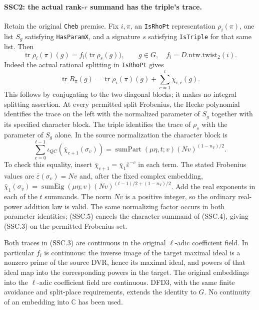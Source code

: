 \paragraph{SSC2: the actual rank-$r$ summand has the triple's trace.}
\label{claim:SSC2}
Retain the original \texttt{Cheb} premise. Fix $i,\pi$, an
\texttt{IsRhoPt} representation $\rho_i(\pi)$, one list $S_g$
satisfying \texttt{HasParamX}, and a signature $s$ satisfying
\texttt{IsTriple} for that same list. Then
\[
 \operatorname{tr}\rho_i(\pi)(g)
   =f_i\bigl(\operatorname{tr}\rho_s(g)\bigr),\qquad g\in G,
 \quad f_i=D.\mathrm{ntw}.\mathrm{twist}_2(i).                  \tag{SSC.3}
\]
Indeed the actual rational splitting in \texttt{IsRhoPt} gives
\[
 \operatorname{tr}R_\pi(g)
    =\operatorname{tr}\rho_i(\pi)(g)
       +\sum_{c=1}^{t}\chi_{i,c}(g).                           \tag{SSC.4}
\]
This follows by conjugating to the two diagonal blocks; it makes
no integral splitting assertion. At every permitted split Frobenius,
the Hecke polynomial identifies the trace on the left with the
normalized parameter of $S_g$ together with its specified character
block. The triple identifies the trace of $\rho_s$ with the parameter
of $S_g$ alone. In the source normalization the character block is
\[
 \sum_{c=0}^{t-1}\iota_{QC}(\bar\chi_{c+1}(\sigma_v))
   =\operatorname{sumPart}(\mu\eta,t;v)
          (Nv)^{(1-n_V)/2}.                                   \tag{SSC.5}
\]
To check this equality, insert
$\bar\chi_{c+1}=\bar\chi_1\bar\varepsilon^{-c}$ in each term.
The stated Frobenius values are $\bar\varepsilon(\sigma_v)=Nv$
and, after the fixed complex embedding,
$\bar\chi_1(\sigma_v)=\operatorname{sumEig}(\mu\eta;v)
(Nv)^{(t-1)/2+(1-n_V)/2}$. Add the real exponents in each
of the $t$ summands. The norm $Nv$ is a positive integer,
so the ordinary real-power addition law is valid. The same
normalizing factor occurs in both parameter identities; (SSC.5)
cancels the character summand of (SSC.4), giving (SSC.3) on the
permitted Frobenius set.

Both traces in (SSC.3) are continuous in the original $\ell$-adic
coefficient field. In particular $f_i$ is continuous: the inverse
image of the target maximal ideal is a nonzero prime of the source
DVR, hence its maximal ideal, and powers of that ideal map into
the corresponding powers in the target. The original embeddings
into the $\ell$-adic coefficient field are continuous. DFD3, with
the same finite avoidance and split-place requirements, extends the
identity to $G$. No continuity of an embedding into $\mathbb C$
has been used.

